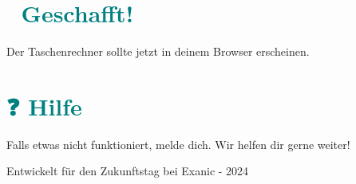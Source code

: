 \documentclass{article}
\begin{document}
\section*{\textcolor{teal}{🎉 Geschafft!}}
Der Taschenrechner sollte jetzt in deinem Browser erscheinen.

\section*{\textcolor{teal}{❓ Hilfe}}
Falls etwas nicht funktioniert, melde dich. Wir helfen dir gerne weiter!

\hrulefill

\begin{flushright}
Entwickelt für den Zukunftstag bei Exanic - 2024
\end{flushright}
\end{document}
